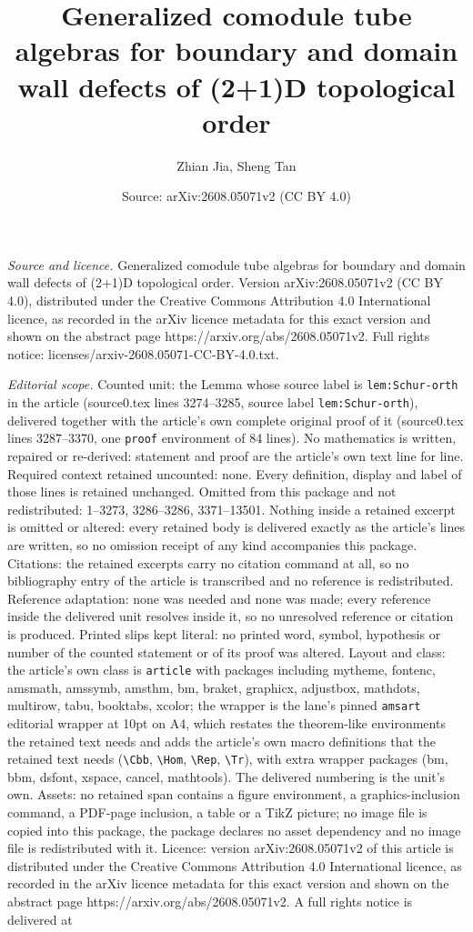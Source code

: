 \documentclass[10pt,a4paper]{amsart}
\title[Generalized comodule tube algebras for boundary and domain w]{Generalized comodule tube algebras for boundary and domain wall defects of (2+1)D topological order}
\author{Zhian Jia, Sheng Tan}
\date{Source: arXiv:2608.05071v2 (CC BY 4.0)}
\begin{document}
\maketitle

\noindent\emph{Source and licence.} Generalized comodule tube algebras for boundary and domain wall defects of (2+1)D topological order. Version arXiv:2608.05071v2 (CC BY 4.0), distributed under the Creative Commons Attribution 4.0 International licence, as recorded in the arXiv licence metadata for this exact version and shown on the abstract page https://arxiv.org/abs/2608.05071v2. Full rights notice: licenses/arxiv-2608.05071-CC-BY-4.0.txt.\par\smallskip

\noindent\textit{Editorial scope.} Counted unit: the Lemma whose source label is \texttt{lem:Schur-orth} in the article (source0.tex lines 3274--3285, source label \texttt{lem:Schur-orth}), delivered together with the article's own complete original proof of it (source0.tex lines 3287--3370, one \texttt{proof} environment of 84 lines). No mathematics is written, repaired or re-derived: statement and proof are the article's own text line for line. Required context retained uncounted: none. Every definition, display and label of those lines is retained unchanged. Omitted from this package and not redistributed: 1--3273, 3286--3286, 3371--13501. Nothing inside a retained excerpt is omitted or altered: every retained body is delivered exactly as the article's lines are written, so no omission receipt of any kind accompanies this package. Citations: the retained excerpts carry no citation command at all, so no bibliography entry of the article is transcribed and no reference is redistributed. Reference adaptation: none was needed and none was made; every reference inside the delivered unit resolves inside it, so no unresolved reference or citation is produced. Printed slips kept literal: no printed word, symbol, hypothesis or number of the counted statement or of its proof was altered. Layout and class: the article's own class is \texttt{article} with packages including mytheme, fontenc, amsmath, amssymb, amsthm, bm, braket, graphicx, adjustbox, mathdots, multirow, tabu, booktabs, xcolor; the wrapper is the lane's pinned \texttt{amsart} editorial wrapper at 10pt on A4, which restates the theorem-like environments the retained text needs and adds the article's own macro definitions that the retained text needs (\texttt{\textbackslash Cbb}, \texttt{\textbackslash Hom}, \texttt{\textbackslash Rep}, \texttt{\textbackslash Tr}), with extra wrapper packages (bm, bbm, dsfont, xspace, cancel, mathtools). The delivered numbering is the unit's own. Assets: no retained span contains a figure environment, a graphics-inclusion command, a PDF-page inclusion, a table or a TikZ picture; no image file is copied into this package, the package declares no asset dependency and no image file is redistributed with it. Licence: version arXiv:2608.05071v2 of this article is distributed under the Creative Commons Attribution 4.0 International licence, as recorded in the arXiv licence metadata for this exact version and shown on the abstract page https://arxiv.org/abs/2608.05071v2. A full rights notice is delivered at 
\end{document}

